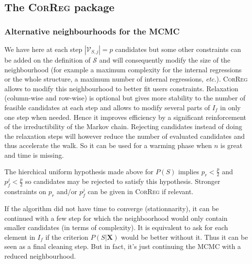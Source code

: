 \documentclass[11pt,a4paper]{article}
\begin{document}
	
	\subsection{The \textsc{CorReg} package}
\subsubsection{Alternative neighbourhoods for the MCMC}
	We have here at each step $|\mathcal{V}_{S,j}|=p$ candidates but some other constraints can be added on the definition of $\mathcal{S}$ and will consequently modify the size of the neighbourhood (for example a maximum complexity for the internal regressions or the whole structure, a maximum number of internal regressions, {\it etc.}). \textsc{CorReg} allows to modify this neighbourhood to better fit users constraints. Relaxation (column-wise and row-wise) is optional but gives more stability to the number of feasible candidates at each step and allows to modify several parts of $I_f$ in only one step when needed. Hence it improves efficiency by a significant reinforcement of the irreductibility of the Markov chain. Rejecting candidates instead of doing the relaxation steps will  however reduce the number of evaluated candidates and thus accelerate the walk. So it can be used for a warming phase when $n$ is great and time is missing.
	
	The hierchical uniform hypothesis made above for $P(S)$ implies $p_r<\frac{p}{2}$ and $p_f^j<\frac{p}{2}$ so candidates may be rejected to satisfy this hypothesis. Stronger constraints on $p_r$ and/or $p_f^j$ can be given in \textsc{CorReg} if relevant.
	
If the algorithm did not have time to converge (stationnarity), it can be continued with a few step for which the neighboorhood would only contain smaller candidates (in terms of complexity). It is equivalent to ask for each element in $I_f$ if the criterion $P(S|\boldsymbol{X})$ would be better without it. Thus it can be seen as a final cleaning step. But in fact, it's just continuing the MCMC with a reduced neighbourhood.	
	
	
	
\end{document}
